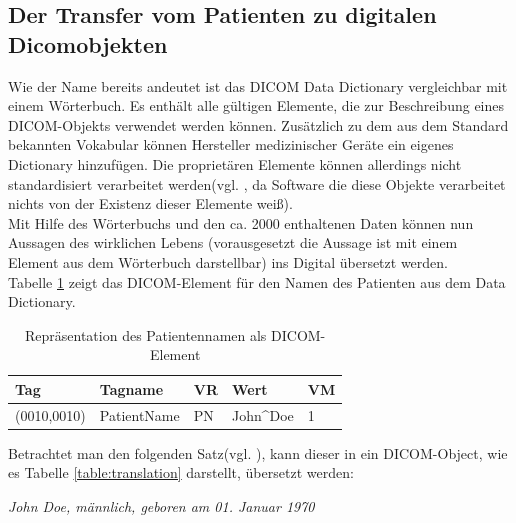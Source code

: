 \subsection{Der Transfer vom Patienten zu digitalen Dicomobjekten} \label{grundlagen:dicomObjects}
Wie der Name bereits andeutet ist das DICOM Data Dictionary vergleichbar mit einem Wörterbuch. Es enthält alle gültigen Elemente, die zur Beschreibung eines DICOM-Objekts verwendet werden können. Zusätzlich zu dem aus dem Standard bekannten Vokabular können Hersteller medizinischer Geräte ein eigenes Dictionary hinzufügen. Die proprietären Elemente können allerdings nicht standardisiert verarbeitet werden(vgl. \cite[S.45]{pianykh:dicom}, da Software die diese Objekte verarbeitet nichts von der Existenz dieser Elemente weiß).\\
Mit Hilfe des Wörterbuchs und den ca. 2000 enthaltenen Daten können nun Aussagen des wirklichen Lebens (vorausgesetzt die Aussage ist mit einem Element aus dem Wörterbuch darstellbar) ins Digital übersetzt werden.\\
Tabelle \ref{table:patientname} zeigt das DICOM-Element für den Namen des Patienten aus dem Data Dictionary\cite[S. 14]{dicom:dd}.

\begin{table}
    \begin{tabularx}{\textwidth}{|X|X|X|X|X|}
    \toprule
    \hline
    \textbf{Tag}         & \textbf{Tagname}     & \textbf{VR} & \textbf{Wert}     	& \textbf{VM} \\ \hline
    (0010,0010) 		 & PatientName 			& PN 		  & John\^{}Doe 		& 1  \\  \hline
    \bottomrule
    \end{tabularx}
    \caption {Repräsentation des Patientennamen als DICOM-Element}
    \label{table:patientname}
\end{table}

Betrachtet man den folgenden Satz(vgl. \cite[S.46]{pianykh:dicom}), kann dieser in ein DICOM-Object, wie es Tabelle \ref*{table:translation} darstellt, übersetzt werden:
\begin{center}
\textit{\glqq John Doe, männlich, geboren am 01. Januar 1970\grqq}
\end{center}

